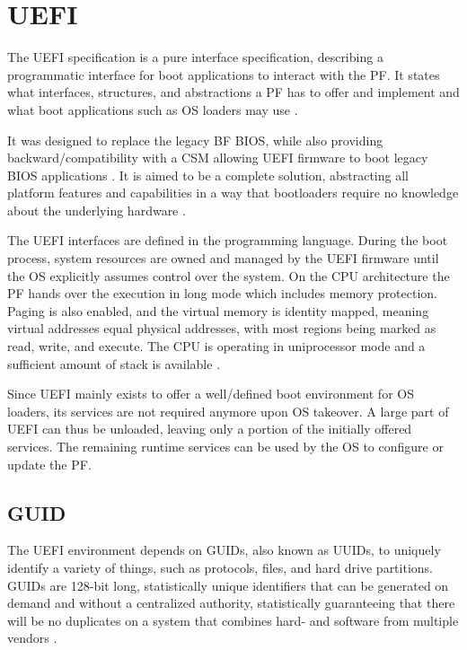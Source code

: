 
\section{\acf{UEFI}}

The \ac{UEFI} specification is a pure interface specification, describing a programmatic interface for boot applications to interact with the \ac{PF}.
It states what interfaces, structures, and abstractions a \ac{PF} has to offer and implement and what boot applications such as \ac{OS} loaders may use \cite{beyond-bios}.

It was designed to replace the legacy \acl{BF} \ac{BIOS}, while also providing backward\-/compatibility with a \acf{CSM} allowing \ac{UEFI} firmware to boot legacy \ac{BIOS} applications \cite{beyond-bios}.
It is aimed to be a complete solution, abstracting all platform features and capabilities in a way that bootloaders require no knowledge about the underlying hardware \cite[1.3]{uefi-spec}.

The \ac{UEFI} interfaces are defined in the  programming language.
During the boot process, system resources are owned and managed by the \ac{UEFI} firmware until the \ac{OS} explicitly assumes control over the system.
On the  \ac{CPU} architecture the \ac{PF} hands over the execution in  long mode which includes memory protection.
Paging is also enabled, and the virtual memory is identity mapped, meaning virtual addresses equal physical addresses, with most regions being marked as read, write, and execute.
The \ac{CPU} is operating in uniprocessor mode and a sufficient amount of stack is available \cite[Section 2.3.4]{uefi-spec}.

Since \ac{UEFI} mainly exists to offer a well\-/defined boot environment for \ac{OS} loaders, its services are not required anymore upon \ac{OS} takeover.
A large part of \ac{UEFI} can thus be unloaded, leaving only a portion of the initially offered services.
The remaining runtime services can be used by the \ac{OS} to configure or update the \ac{PF}.

\subsection{\acf{GUID}}

The \ac{UEFI} environment depends on \acp{GUID}, also known as \acp{UUID}, to uniquely identify a variety of things, such as protocols, files, and hard drive partitions.
\acp{GUID} are 128-bit long, statistically unique identifiers that can be generated on demand and without a centralized authority, statistically guaranteeing that there will be no duplicates on a system that combines hard- and software from multiple vendors \cite{rfc-4122}.


